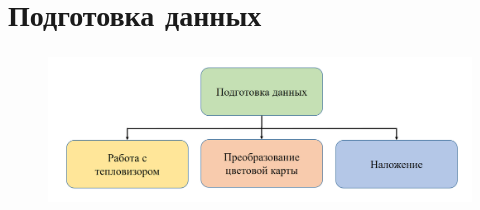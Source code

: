 \documentclass[t]{beamer}
\begin{document}
\section{Подготовка данных}

	\begin{frame}
		\frametitle{\insertsection} 
		\vspace{1cm}
		\begin{figure}
			\centering
			\includegraphics[width = \textwidth]{image/scheme2}	
		\end{figure}
	\end{frame}
\end{document}

